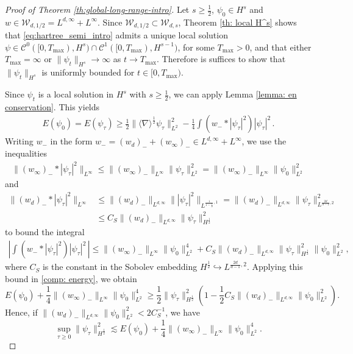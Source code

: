 \documentclass[12pt]{article}
\theoremstyle{plain}
\begin{document}
\begin{proof}[Proof of Theorem \ref{th:global-long-range-intro}]
Let $s\ge\frac12$, $\psi_0\in H^s$ and $w\in \mathcal{W}_{d,1/2}=L^{d,\infty}+L^\infty$. Since $\mathcal{W}_{d,1/2}\subset\mathcal{W}_{d,s}$, Theorem \ref{th: local H^s} shows that \eqref{eq:hartree_semi_intro} admits a unique local solution $\psi \in \mathcal{C}^0 ([0,T_{\max}), H^s)\cap\mathcal{C}^1 ([0,T_{\max}), H^{s-1})$, for some $T_{\max}>0$, and that either $T_{\max}= \infty$ or $\|\psi_t\|_{H^s}\to \infty$ as $t\to T_{\max}$. Therefore is suffices to show that $\|\psi_t\|_{H^s}$ is uniformly bounded for $t\in[0,T_{\max})$.


Since $\psi_t$ is a local solution in $H^s$ with $s\ge\frac12$, we can apply Lemma \ref{lemma: en conservation}. This yields
\begin{align}
\label{comp: energy}
    E(\psi_0) = E(\psi_\tau)\geq  \frac12 \| \langle \nabla\rangle ^{\frac12} \psi_\tau\|^2_{L^2} - \frac14 \int (w_-*|\psi_\tau|^2 )|\psi_\tau|^2\,  .
\end{align}
Writing $w_-$ in the form $w_-= (w_d)_-  + (w_\infty)_- \in L^{d, \infty} + L^\infty$, we use the inequalities
\begin{align*}
    \|(w_\infty)_-*|\psi_\tau|^2 \|_{L^\infty} \leq \|(w_\infty)_-\|_{L^\infty} \|\psi_\tau\|_{L^2}^2 = \|(w_\infty)_-\|_{L^\infty}\|\psi_0\|_{L^2}^2 
\end{align*}
and 
\begin{align*}
    \|(w_d)_-*|\psi_\tau|^2 \|_{L^\infty} &\leq \|(w_d)_-\|_{L^{d,\infty }}\||\psi_\tau|^2\|_{L^{\frac{1}{1-\frac{1}{d}},1}} =  \|(w_d)_-\|_{L^{d,\infty }}\|\psi_\tau\|_{L^{\frac{2d}{d-1}, 2}}^2\\
    &\leq  C_S\|(w_d)_-\|_{L^{d,\infty }}\|\psi_\tau\|_{H^{\frac12}}^2
\end{align*}
to bound the integral
\begin{align*}
    \left| \int (w_-*|\psi_\tau|^2 )|\psi_\tau|^2\,   \right| \leq \|(w_\infty)_-\|_{L^\infty}\|\psi_0\|_{L^2}^4+ C_S\|(w_d)_-\|_{L^{d,\infty }}\|\psi_\tau\|_{H^{\frac12}}^2\|\psi_0\|_{L^2}^2,
\end{align*}
where $C_S$ is the constant in the Sobolev embedding $H^{\frac12}\hookrightarrow L^{\frac{2d}{d-1}, 2}$. 
Applying this bound in \eqref{comp: energy}, we obtain 
\begin{equation*}
    E(\psi_0) +\frac14\|(w_\infty)_-\|_{L^\infty}\|\psi_0\|_{L^2}^4 \geq \frac12 \|\psi_\tau\|_{H^{\frac12}}^2 (1- \frac12 C_S \|(w_d)_-\|_{L^{d,\infty }}\|\psi_0\|_{L^2}^2).
\end{equation*}
Hence, if $\|(w_d)_-\|_{L^{d,\infty }}\|\psi_0\|_{L^2}^2 < 2C_S^{-1}$, we have 
\begin{equation}\label{eq:unif-bound-H12}
    \sup_{\tau\ge 0} \|\psi_\tau\|_{H^{\frac12}}^2 \lesssim E(\psi_0)+\frac14\|(w_\infty)_-\|_{L^\infty}\|\psi_0\|_{L^2}^4. 
\end{equation}



\end{proof}
\end{document}
